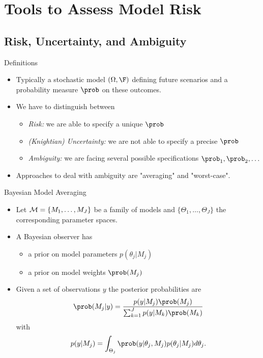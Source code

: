 \section{Tools to Assess Model Risk}
\subsection{Risk, Uncertainty, and Ambiguity}



{Definitions}
\begin{itemize}
\item<1-> Typically a stochastic model $(\Omega, \F)$ defining future scenarios and a
probability measure $\prob$ on these outcomes.
\item<2->  We have to distinguish between
\begin{itemize}
\item {\it Risk:}  we are able to specify a unique $\prob$
\item {\it (Knightian) Uncertainty:} we are not able to specify a precise $\prob$
\item {\it Ambiguity:}  we are facing several possible specifications $\prob_1, \prob_2, \ldots$\end{itemize}
\item<3-> Approaches to deal with ambiguity are "averaging" and "worst-case".
\end{itemize}



{Bayesian Model Averaging}
\begin{itemize}
\item<1-> Let ${\cal M}= \{M_1, \dots, M_J\}$ be a family of models and  $\{\Theta_1, \dots, \Theta_J\}$ the corresponding parameter spaces.
\item<2->  A Bayesian observer has
\begin{itemize}
\item a prior on model parameters $p(\theta_j|M_j)$
\item a prior on model weights $\prob(M_j)$
\end{itemize}
\item<3-> Given a set of observations $y$ the posterior probabilities are
$$
\prob(M_j|y) = \frac{p(y|M_j)\prob(M_j)}{\sum_{k=1}^{J}p(y|M_k)\prob(M_k)}
$$
with
$$
p(y|M_j)=\int_{\Theta_j} \prob(y|\theta_j, M_j)p(\theta_j|M_j) d\theta_j.
$$
\end{itemize}



